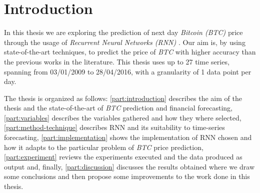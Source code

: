 
\chapter{Introduction} %

\label{ch:introduction}

In this thesis we are exploring the prediction of next day
\textit{Bitcoin (BTC)} price through the usage of \textit{Recurrent
Neural Networks (RNN)} . Our aim is, by using state-of-the-art
techniques, to predict the price of \textit{BTC} with higher accuracy than
the previous works in the literature. This thesis uses up to 27 time
series, spanning from 03/01/2009 to 28/04/2016, with a granularity of
1 data point per day.

The thesis is organized as follows: \autoref{part:introduction}
describes the aim of the thesis and the state-of-the-art of \textit{BTC}
prediction and financial forecasting, \autoref{part:variables}
describes the variables gathered and how they where selected,
\autoref{part:method-technique} describes RNN and its suitability to
time-series forecasting, \autoref{part:implementation} shows the
implementation of RNN chosen and how it adapts to the particular
problem of \textit{BTC} price prediction, \autoref{part:experiment} reviews
the experiments executed and the data produced as output and, finally,
\autoref{part:discussion} discusses the results obtained where we draw
some conclusions and then propose some improvements to the work done
in this thesis.

